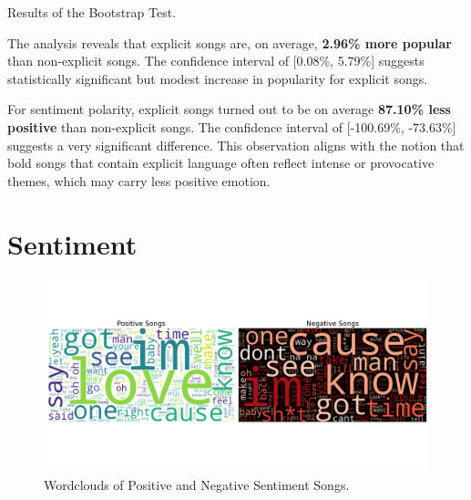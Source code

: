 \begin{table}[H]
\centering
\caption{Results of the Bootstrap Test.}
\end{table}


The analysis reveals that explicit songs are, on average, \textbf{2.96\% more
popular} than non-explicit songs. The confidence interval of [0.08\%, 5.79\%]
suggests statistically significant but modest increase in popularity for
explicit songs.

For sentiment polarity, explicit songs turned out to be on average
\textbf{87.10\% less positive} than non-explicit songs. The confidence interval
of [-100.69\%, -73.63\%] suggests a very significant difference. This
observation aligns with the notion that bold songs that contain explicit
language often reflect intense or provocative themes, which may carry less
positive emotion.

\section{Sentiment}
\label{sec:sentiment}
\begin{center}
\begin{figure}[H]
  \centering
  \includegraphics[width=7in]{img/wordclouds.png}
  \caption{Wordclouds of Positive and Negative Sentiment Songs.}
  \label{Figure:fig_bh}
\end{figure}
\end{center}

